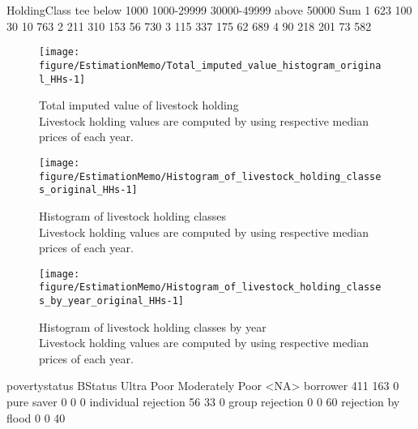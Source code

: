 \begin{Schunk}
\begin{Soutput}
   HoldingClass
tee below 1000 1000-29999 30000-49999 above 50000 Sum
  1        623        100          30          10 763
  2        211        310         153          56 730
  3        115        337         175          62 689
  4         90        218         201          73 582
\end{Soutput}
\end{Schunk}
\begin{Schunk}
\begin{figure}

{\centering \texttt{[image: figure/EstimationMemo/Total\_imputed\_value\_histogram\_original\_HHs-1]} 

}

\caption{Total imputed value of livestock holding\\ {\footnotesize Livestock holding values are computed by using respective median prices of each year.\setlength{\baselineskip}{8pt}}}\label{Figure Total imputed value histogram original HHs}
\end{figure}
\end{Schunk}
\begin{Schunk}
\begin{figure}

{\centering \texttt{[image: figure/EstimationMemo/Histogram\_of\_livestock\_holding\_classes\_original\_HHs-1]} 

}

\caption{Histogram of livestock holding classes\\ {\footnotesize Livestock holding values are computed by using respective median prices of each year.\setlength{\baselineskip}{8pt}}}\label{Figure Histogram of livestock holding classes original HHs}
\end{figure}
\end{Schunk}
\begin{Schunk}
\begin{figure}

{\centering \texttt{[image: figure/EstimationMemo/Histogram\_of\_livestock\_holding\_classes\_by\_year\_original\_HHs-1]} 

}

\caption{Histogram of livestock holding classes by year\\ {\footnotesize Livestock holding values are computed by using respective median prices of each year.\setlength{\baselineskip}{8pt}}}\label{Figure Histogram of livestock holding classes by year original HHs}
\end{figure}
\end{Schunk}
\begin{Schunk}
\begin{Soutput}
                      povertystatus
BStatus                Ultra Poor Moderately Poor <NA>
  borrower                    411             163    0
  pure saver                    0               0    0
  individual rejection         56              33    0
  group rejection               0               0   60
  rejection by flood            0               0   40
\end{Soutput}
\end{Schunk}

